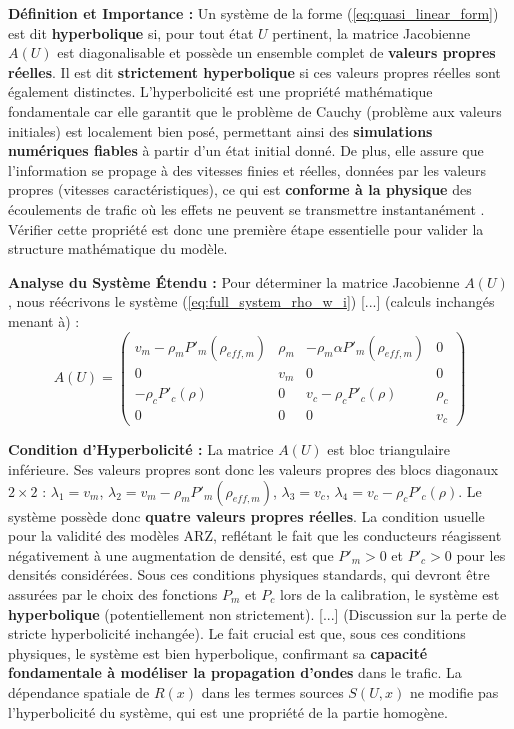\textbf{Définition et Importance :} Un système de la forme (\ref{eq:quasi_linear_form}) est dit \textbf{hyperbolique} si, pour tout état \( U \) pertinent, la matrice Jacobienne \( A(U) \) est diagonalisable et possède un ensemble complet de \textbf{valeurs propres réelles}. Il est dit \textbf{strictement hyperbolique} si ces valeurs propres réelles sont également distinctes. L'hyperbolicité est une propriété mathématique fondamentale car elle garantit que le problème de Cauchy (problème aux valeurs initiales) est localement bien posé, permettant ainsi des \textbf{simulations numériques fiables} à partir d'un état initial donné. De plus, elle assure que l'information se propage à des vitesses finies et réelles, données par les valeurs propres (vitesses caractéristiques), ce qui est \textbf{conforme à la physique} des écoulements de trafic où les effets ne peuvent se transmettre instantanément \cite{LeVeque2002}. Vérifier cette propriété est donc une première étape essentielle pour valider la structure mathématique du modèle.

\textbf{Analyse du Système Étendu :} Pour déterminer la matrice Jacobienne \( A(U) \), nous réécrivons le système (\ref{eq:full_system_rho_w_i}) [...] (calculs inchangés menant à) :
\[
A(U) =
\begin{pmatrix}
 v_m - \rho_m P'_m(\rho_{eff,m}) & \rho_m & - \rho_m \alpha P'_m(\rho_{eff,m}) & 0 \\
 0 & v_m & 0 & 0 \\
 - \rho_c P'_c(\rho) & 0 & v_c - \rho_c P'_c(\rho) & \rho_c \\
 0 & 0 & 0 & v_c
\end{pmatrix}
\]

\textbf{Condition d'Hyperbolicité :} La matrice \( A(U) \) est bloc triangulaire inférieure. Ses valeurs propres sont donc les valeurs propres des blocs diagonaux \( 2 \times 2 \) : \( \lambda_1 = v_m \), \( \lambda_2 = v_m - \rho_m P'_m(\rho_{eff,m}) \), \( \lambda_3 = v_c \), \( \lambda_4 = v_c - \rho_c P'_c(\rho) \). Le système possède donc \textbf{quatre valeurs propres réelles}. La condition usuelle pour la validité des modèles ARZ, reflétant le fait que les conducteurs réagissent négativement à une augmentation de densité, est que \( P'_m > 0 \) et \( P'_c > 0 \) pour les densités considérées. Sous ces conditions physiques standards, qui devront être assurées par le choix des fonctions \( P_m \) et \( P_c \) lors de la calibration, le système est \textbf{hyperbolique} (potentiellement non strictement). [...] (Discussion sur la perte de stricte hyperbolicité inchangée). Le fait crucial est que, sous ces conditions physiques, le système est bien hyperbolique, confirmant sa \textbf{capacité fondamentale à modéliser la propagation d'ondes} dans le trafic. La dépendance spatiale de \( R(x) \) dans les termes sources \( S(U, x) \) ne modifie pas l'hyperbolicité du système, qui est une propriété de la partie homogène.

